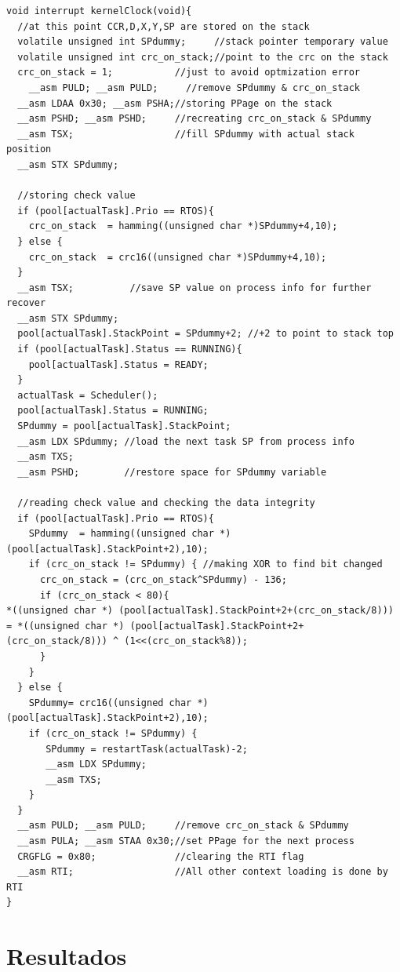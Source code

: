 \documentclass[12pt,openright,oneside,a4paper,brazil]{abntex2}
\begin{document}
\begin{lstlisting}[float,caption=Rotina responsável por executar a troca de contexto entre os processos,label=cod:kernelClock]
void interrupt kernelClock(void){
  //at this point CCR,D,X,Y,SP are stored on the stack
  volatile unsigned int SPdummy;     //stack pointer temporary value
  volatile unsigned int crc_on_stack;//point to the crc on the stack
  crc_on_stack = 1;           //just to avoid optmization error
    __asm PULD; __asm PULD;     //remove SPdummy & crc_on_stack
  __asm LDAA 0x30; __asm PSHA;//storing PPage on the stack
  __asm PSHD; __asm PSHD;     //recreating crc_on_stack & SPdummy
  __asm TSX;                  //fill SPdummy with actual stack position
  __asm STX SPdummy;
  
  //storing check value  
  if (pool[actualTask].Prio == RTOS){
    crc_on_stack  = hamming((unsigned char *)SPdummy+4,10);
  } else {
    crc_on_stack  = crc16((unsigned char *)SPdummy+4,10); 
  }
  __asm TSX;		  //save SP value on process info for further recover
  __asm STX SPdummy;
  pool[actualTask].StackPoint = SPdummy+2; //+2 to point to stack top
  if (pool[actualTask].Status == RUNNING){
    pool[actualTask].Status = READY;
  }
  actualTask = Scheduler();
  pool[actualTask].Status = RUNNING;
  SPdummy = pool[actualTask].StackPoint; 
  __asm LDX SPdummy; //load the next task SP from process info
  __asm TXS;
  __asm PSHD;        //restore space for SPdummy variable
  
  //reading check value and checking the data integrity
  if (pool[actualTask].Prio == RTOS){
    SPdummy  = hamming((unsigned char *)(pool[actualTask].StackPoint+2),10);
    if (crc_on_stack != SPdummy) { //making XOR to find bit changed
      crc_on_stack = (crc_on_stack^SPdummy) - 136; 
      if (crc_on_stack < 80){
*((unsigned char *) (pool[actualTask].StackPoint+2+(crc_on_stack/8))) = *((unsigned char *) (pool[actualTask].StackPoint+2+(crc_on_stack/8))) ^ (1<<(crc_on_stack%8));
      }
    }
  } else {
    SPdummy= crc16((unsigned char *)(pool[actualTask].StackPoint+2),10); 
    if (crc_on_stack != SPdummy) {
       SPdummy = restartTask(actualTask)-2;
       __asm LDX SPdummy;
       __asm TXS;
    }
  }
  __asm PULD; __asm PULD;     //remove crc_on_stack & SPdummy
  __asm PULA; __asm STAA 0x30;//set PPage for the next process
  CRGFLG = 0x80;              //clearing the RTI flag
  __asm RTI;                  //All other context loading is done by RTI
}
\end{lstlisting}

\chapter{Resultados}
\end{document}

